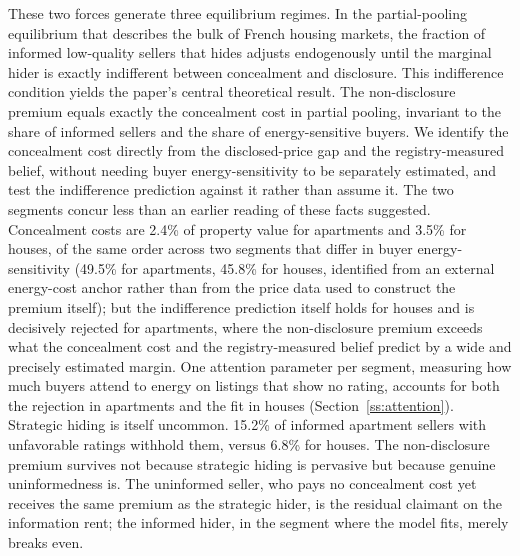 These two forces generate three equilibrium regimes. In the partial-pooling equilibrium that describes the bulk of French housing markets, the fraction of informed low-quality sellers that hides adjusts endogenously until the marginal hider is exactly indifferent between concealment and disclosure. This indifference condition yields the paper's central theoretical result. The non-disclosure premium equals exactly the concealment cost in partial pooling, invariant to the share of informed sellers and the share of energy-sensitive buyers. We identify the concealment cost directly from the disclosed-price gap and the registry-measured belief, without needing buyer energy-sensitivity to be separately estimated, and test the indifference prediction against it rather than assume it. The two segments concur less than an earlier reading of these facts suggested. Concealment costs are 2.4\% of property value for apartments and 3.5\% for houses, of the same order across two segments that differ in buyer energy-sensitivity (49.5\% for apartments, 45.8\% for houses, identified from an external energy-cost anchor rather than from the price data used to construct the premium itself); but the indifference prediction itself holds for houses and is decisively rejected for apartments, where the non-disclosure premium exceeds what the concealment cost and the registry-measured belief predict by a wide and precisely estimated margin. One attention parameter per segment, measuring how much buyers attend to energy on listings that show no rating, accounts for both the rejection in apartments and the fit in houses (Section~\ref{ss:attention}). %
Strategic hiding is itself uncommon. 15.2\% of informed apartment sellers with unfavorable ratings withhold them, versus 6.8\% for houses. The non-disclosure premium survives not because strategic hiding is pervasive but because genuine uninformedness is. The uninformed seller, who pays no concealment cost yet receives the same premium as the strategic hider, is the residual claimant on the information rent; the informed hider, in the segment where the model fits, merely breaks even.
